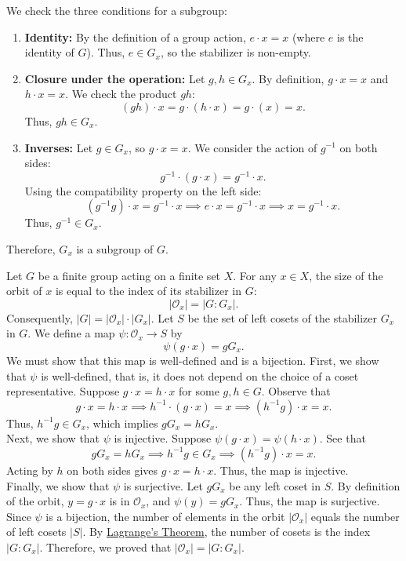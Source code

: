 \documentclass[a4paper,12pt]{article}
\begin{document}
{
    We check the three conditions for a subgroup:
    \begin{enumerate}
        \item \textbf{Identity:} By the definition of a group action, $e \cdot x = x$ (where $e$ is the identity of $G$). Thus, $e \in G_x$, so the stabilizer is non-empty.
        
        \item \textbf{Closure under the operation:} Let $g, h \in G_x$. By definition, $g \cdot x = x$ and $h \cdot x = x$. We check the product $gh$:
        \[ (gh) \cdot x = g \cdot (h \cdot x) = g \cdot (x) = x. \]
        Thus, $gh \in G_x$.
        
        \item \textbf{Inverses:} Let $g \in G_x$, so $g \cdot x = x$. We consider the action of $g^{-1}$ on both sides:
        \[ g^{-1} \cdot (g \cdot x) = g^{-1} \cdot x. \]
        Using the compatibility property on the left side:
        \[ (g^{-1}g) \cdot x = g^{-1} \cdot x \implies e \cdot x = g^{-1} \cdot x \implies x = g^{-1} \cdot x. \]
        Thus, $g^{-1} \in G_x$.
    \end{enumerate}
    Therefore, $G_x$ is a subgroup of $G$.
}
{
    Let $G$ be a finite group acting on a finite set $X$. For any $x \in X$, the size of the orbit of $x$ is equal to the index of its stabilizer in $G$:
    \[ |\mathcal{O}_x| = |G : G_x|. \]
    Consequently, $|G| = |\mathcal{O}_x| \cdot |G_x|$.
}
{
    Let $S$ be the set of left cosets of the stabilizer $G_x$ in $G$. We define a map $\psi: \mathcal{O}_x \to S$ by
    \[ \psi(g \cdot x) = gG_x. \]
    We must show that this map is well-defined and is a bijection.
    First, we show that $\psi$ is well-defined, that is, it does not depend on the choice of a coset representative. Suppose $g \cdot x = h \cdot x$ for some $g, h \in G$. Observe that
    \[ g \cdot x = h \cdot x \implies h^{-1} \cdot (g \cdot x) = x \implies (h^{-1}g) \cdot x = x. \]
    Thus, $h^{-1}g \in G_x$, which implies $gG_x = hG_x$.
    \\Next, we show that $\psi$ is injective. Suppose $\psi(g \cdot x) = \psi(h \cdot x)$. See that
    \[ gG_x = hG_x \implies h^{-1}g \in G_x \implies (h^{-1}g) \cdot x = x. \]
    Acting by $h$ on both sides gives $g \cdot x = h \cdot x$. Thus, the map is injective.
    \\Finally, we show that $\psi$ is surjective. Let $gG_x$ be any left coset in $S$. By definition of the orbit, $y = g \cdot x$ is in $\mathcal{O}_x$, and $\psi(y) = gG_x$. Thus, the map is surjective.
    Since $\psi$ is a bijection, the number of elements in the orbit $|\mathcal{O}_x|$ equals the number of left cosets $|S|$. By \hyperref[thm:Lagrange]{Lagrange's Theorem}, the number of cosets is the index $|G : G_x|$.
    Therefore, we proved that $|\mathcal{O}_x| = |G : G_x|$.
}
\end{document}
